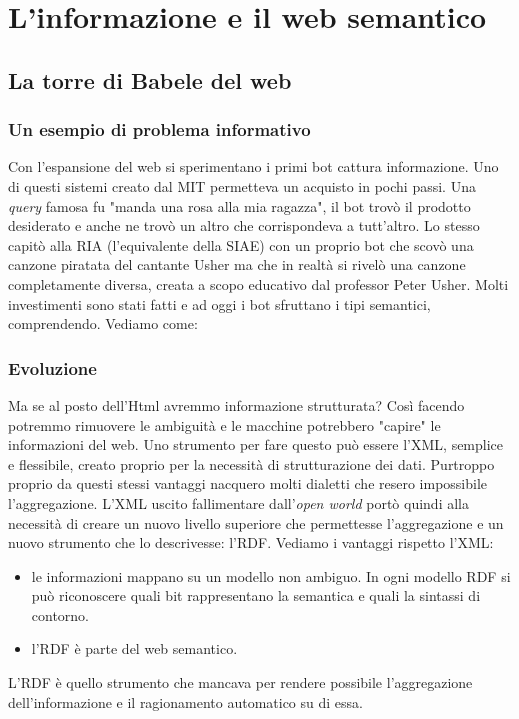 
\chapter{L'informazione e il web semantico}

	\section{La torre di Babele del web}
	
		\subsection{Un esempio di problema informativo}
			Con l'espansione del web si sperimentano i primi bot cattura informazione. Uno di questi sistemi creato dal MIT permetteva un acquisto in pochi passi. Una \emph{query} famosa fu "manda una rosa alla mia ragazza", il bot trovò il prodotto desiderato e anche ne trovò un altro che corrispondeva a tutt'altro.
			Lo stesso capitò alla RIA (l'equivalente della SIAE) con un proprio bot che scovò una canzone piratata del cantante Usher ma che in realtà si rivelò una canzone completamente diversa, creata a scopo educativo dal professor Peter Usher.
			Molti investimenti sono stati fatti e ad oggi i bot sfruttano i tipi semantici, comprendendo. Vediamo come:
		
		\subsection{Evoluzione}
			Ma se al posto dell'Html avremmo informazione strutturata? Così facendo potremmo rimuovere le  ambiguità e le macchine potrebbero "capire" le informazioni del web. Uno strumento per fare questo può essere l'XML, semplice e flessibile, creato proprio per la necessità di strutturazione dei dati. Purtroppo proprio da questi stessi vantaggi nacquero molti dialetti che resero impossibile l'aggregazione. L'XML uscito fallimentare dall'\emph{open world} portò quindi alla necessità di creare un nuovo livello superiore che permettesse l'aggregazione e un nuovo strumento che lo descrivesse: l'RDF. Vediamo i vantaggi rispetto l'XML:
			\begin{itemize}
				\item le informazioni mappano su un modello non ambiguo. In ogni modello RDF si può riconoscere quali bit rappresentano la semantica e quali la sintassi di contorno.
				\item l'RDF è parte del web semantico.
			\end{itemize}
			L'RDF è quello strumento che mancava per rendere possibile l'aggregazione dell'informazione e il ragionamento automatico su di essa.
		
